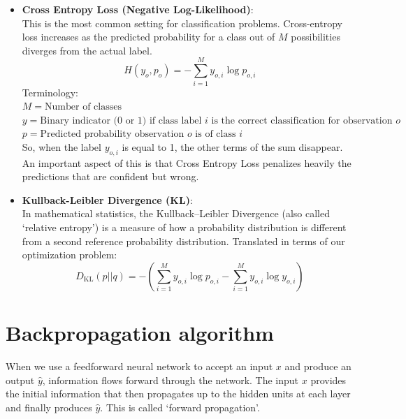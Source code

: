 \begin{itemize}
    \item \textbf{Cross Entropy Loss (Negative Log-Likelihood)}:\\
    This is the most common setting for classification problems. Cross-entropy loss increases as the predicted probability for a class out of $M$ possibilities diverges from the actual label.
    \begin{equation}
        H(y_o,p_o) = - \sum_{i=1}^{M} y_{o,i} \log{p_{o,i}}
    \end{equation}
    Terminology:\\
    $M = \text{Number of classes}$\\
    $y = \text{Binary indicator (0 or 1) if class label $i$ is the correct classification for observation $o$}$\\
    $p = \text{Predicted probability observation $o$ is of class $i$}$\\
    So, when the label $y_{o,i}$ is equal to 1, the other terms of the sum disappear. An important aspect of this is that Cross Entropy Loss penalizes heavily the predictions that are confident but wrong.
    
    \item \textbf{Kullback-Leibler Divergence (KL)}:\\
    In mathematical statistics, the Kullback–Leibler Divergence (also called `relative entropy') is a measure of how a probability distribution is different from a second reference probability distribution. Translated in terms of our optimization problem:
    \begin{equation}
        D_{\mathrm{KL}}(p||q) = - \left( \sum_{i=1}^{M} y_{o,i} \log{p_{o,i}} - \sum_{i=1}^{M} y_{o,i} \log{y_{o,i}} \right)
    \end{equation}
\end{itemize}





\section{Backpropagation algorithm}
When we use a feedforward neural network to accept an input $x$ and produce an output $\hat{y}$, information flows forward through the network. The input $x$ provides the initial information that then propagates up to the hidden units at each layer and finally produces $\hat{y}$. This is called `forward propagation'. 

